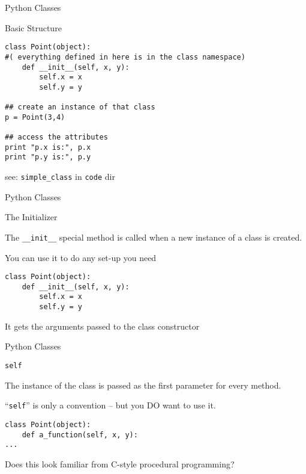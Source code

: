 \documentclass{beamer}
\begin{document}
\begin{frame}[fragile]{Python Classes}

{\Large Basic Structure}

\begin{verbatim}
class Point(object):
#( everything defined in here is in the class namespace)
    def __init__(self, x, y):
        self.x = x
        self.y = y

## create an instance of that class        
p = Point(3,4)

## access the attributes
print "p.x is:", p.x
print "p.y is:", p.y
\end{verbatim}

see: \verb|simple_class| in \verb|code| dir
\end{frame} 


\begin{frame}[fragile]{Python Classes}

{\LARGE The Initializer}

\vfill
{\Large The \verb|__init__| special method is called when a new instance of a class is created.}

\vfill
{\Large You can use it to do any set-up you need}

\vfill
\begin{verbatim}
class Point(object):
    def __init__(self, x, y):
        self.x = x
        self.y = y
\end{verbatim}
\vfill
{\Large It gets the arguments passed to the class constructor}
\end{frame} 

\begin{frame}[fragile]{Python Classes}

{\LARGE \verb|self|}

\vfill
{\Large The instance of the class is passed as the first parameter for every method.}

\vfill
{\Large ``\verb|self|'' is only a convention -- but you DO want to use it.}

\vfill
\begin{verbatim}
class Point(object):
    def a_function(self, x, y):
...
\end{verbatim}
\vfill
{\Large Does this look familiar from C-style procedural programming?}
\end{frame} 
\end{document}
